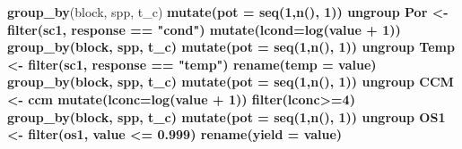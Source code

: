 \documentclass[]{scrartcl}
\newenvironment{Shaded}{\begin{snugshade}}{\end{snugshade}}
\newcommand{\DataTypeTok}[1]{\textcolor[rgb]{0.13,0.29,0.53}{#1}}
\newcommand{\DecValTok}[1]{\textcolor[rgb]{0.00,0.00,0.81}{#1}}
\newcommand{\FloatTok}[1]{\textcolor[rgb]{0.00,0.00,0.81}{#1}}
\newcommand{\KeywordTok}[1]{\textcolor[rgb]{0.13,0.29,0.53}{\textbf{#1}}}
\newcommand{\NormalTok}[1]{#1}
\newcommand{\OperatorTok}[1]{\textcolor[rgb]{0.81,0.36,0.00}{\textbf{#1}}}
\newcommand{\StringTok}[1]{\textcolor[rgb]{0.31,0.60,0.02}{#1}}
\begin{document}
\begin{Shaded}
\begin{Highlighting}[]
{{{{{{{{{{{{{{{{{{{{{{{{{\StringTok{            }\KeywordTok{group_by}\NormalTok{(block, spp, t_c) }\OperatorTok{%
\StringTok{             }\KeywordTok{mutate}\NormalTok{(}\DataTypeTok{pot =} \KeywordTok{seq}\NormalTok{(}\DecValTok{1}\NormalTok{,}\KeywordTok{n}\NormalTok{(), }\DecValTok{1}\NormalTok{)) }\OperatorTok{%
\StringTok{            }\NormalTok{ungroup }
\NormalTok{  Por <-}\StringTok{ }\KeywordTok{filter}\NormalTok{(sc1, response }\OperatorTok{==}\StringTok{ "cond"}\NormalTok{) }\OperatorTok{%
\StringTok{            }\KeywordTok{mutate}\NormalTok{(}\DataTypeTok{lcond=}\KeywordTok{log}\NormalTok{(value }\OperatorTok{+}\StringTok{ }\DecValTok{1}\NormalTok{))  }\OperatorTok{%
\StringTok{            }\KeywordTok{group_by}\NormalTok{(block, spp, t_c) }\OperatorTok{%
\StringTok{             }\KeywordTok{mutate}\NormalTok{(}\DataTypeTok{pot =} \KeywordTok{seq}\NormalTok{(}\DecValTok{1}\NormalTok{,}\KeywordTok{n}\NormalTok{(), }\DecValTok{1}\NormalTok{)) }\OperatorTok{%
\StringTok{            }\NormalTok{ungroup }
\NormalTok{  Temp <-}\StringTok{ }\KeywordTok{filter}\NormalTok{(sc1, response }\OperatorTok{==}\StringTok{ "temp"}\NormalTok{) }\OperatorTok{%
\StringTok{            }\KeywordTok{rename}\NormalTok{(}\DataTypeTok{temp =}\NormalTok{ value)  }\OperatorTok{%
\StringTok{            }\KeywordTok{group_by}\NormalTok{(block, spp, t_c) }\OperatorTok{%
\StringTok{             }\KeywordTok{mutate}\NormalTok{(}\DataTypeTok{pot =} \KeywordTok{seq}\NormalTok{(}\DecValTok{1}\NormalTok{,}\KeywordTok{n}\NormalTok{(), }\DecValTok{1}\NormalTok{)) }\OperatorTok{%
\StringTok{            }\NormalTok{ungroup }
\NormalTok{  CCM <-}\StringTok{ }\NormalTok{ccm  }\OperatorTok{%
\StringTok{           }\KeywordTok{mutate}\NormalTok{(}\DataTypeTok{lconc=}\KeywordTok{log}\NormalTok{(value }\OperatorTok{+}\StringTok{ }\DecValTok{1}\NormalTok{)) }\OperatorTok{%
\StringTok{           }\KeywordTok{filter}\NormalTok{(lconc}\OperatorTok{>=}\DecValTok{4}\NormalTok{)  }\OperatorTok{%
\StringTok{            }\KeywordTok{group_by}\NormalTok{(block, spp, t_c) }\OperatorTok{%
\StringTok{             }\KeywordTok{mutate}\NormalTok{(}\DataTypeTok{pot =} \KeywordTok{seq}\NormalTok{(}\DecValTok{1}\NormalTok{,}\KeywordTok{n}\NormalTok{(), }\DecValTok{1}\NormalTok{)) }\OperatorTok{%
\StringTok{            }\NormalTok{ungroup }
\NormalTok{  OS1 <-}\StringTok{ }\KeywordTok{filter}\NormalTok{(os1, value }\OperatorTok{<=}\StringTok{ }\FloatTok{0.999}\NormalTok{) }\OperatorTok{%
\StringTok{            }\KeywordTok{rename}\NormalTok{(}\DataTypeTok{yield =}\NormalTok{ value)  }\OperatorTok{%
}}}}}}}}}}}}}}}}}}}}}}}}}}}}}}}}}}}}}}}}}}
\end{Highlighting}
\end{Shaded}
\end{document}
